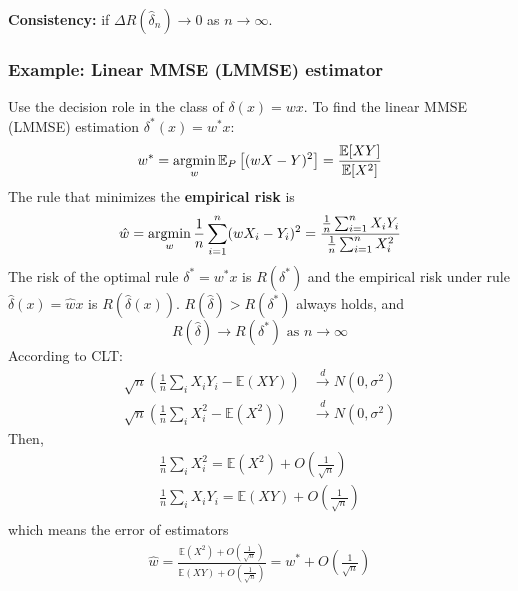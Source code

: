 \documentclass[11pt,a4paper]{article}
\newcommand{\argmin}{\operatornamewithlimits{argmin}}
\begin{document}
\textbf{Consistency:} if $\Delta R(\hat{\delta}_n) \rightarrow 0$ as $n \rightarrow \infty$.

\subsubsection{Example: Linear MMSE (LMMSE) estimator}
Use the decision role in the class of $\delta(x)=wx$. To find the linear MMSE (LMMSE) estimation $\delta^*(x)=w^*x$:
\begin{equation}
    \begin{aligned}
        w^*=\argmin_{w}\mathbb{E}_P\left[(wX-Y)^2\right]=\frac{\mathbb{E}[XY]}{\mathbb{E}[X^2]}
    \end{aligned}
    \nonumber
\end{equation}
The rule that minimizes the \textbf{empirical risk} is
\begin{equation}
    \begin{aligned}
        \hat{w}=\argmin_{w}\frac{1}{n}\sum_{i=1}^n(wX_i-Y_i)^2=\frac{\frac{1}{n}\sum_{i=1}^nX_iY_i}{\frac{1}{n}\sum_{i=1}^nX_i^2}
    \end{aligned}
    \nonumber
\end{equation}
The risk of the optimal rule $\delta^*=w^*x$ is $R(\delta^*)$ and the empirical risk under rule $\hat{\delta}(x)=\hat{w}x$ is $R(\hat{\delta}(x))$. $R(\hat{\delta})>R(\delta^*)$ always holds, and $$R(\hat{\delta})\rightarrow R(\delta^*)\text{ as }n \rightarrow \infty$$
According to CLT:
\begin{equation}
    \begin{aligned}
        \sqrt{n}\left(\frac{1}{n}\sum_iX_iY_i- \mathbb{E}(XY)\right) &\stackrel{d}{\longrightarrow} N(0,\sigma^2)\\
        \sqrt{n}\left(\frac{1}{n}\sum_iX_i^2- \mathbb{E}(X^2)\right) &\stackrel{d}{\longrightarrow} N(0,\sigma^2)
    \end{aligned}
    \nonumber
\end{equation}
Then,
\begin{equation}
    \begin{aligned}
        \frac{1}{n}\sum_iX_i^2=\mathbb{E}(X^2)+O(\frac{1}{\sqrt{n}})\\
        \frac{1}{n}\sum_iX_iY_i=\mathbb{E}(XY)+O(\frac{1}{\sqrt{n}})\\
    \end{aligned}
    \nonumber
\end{equation}
which means the error of estimators
\begin{equation}
    \begin{aligned}
        \hat{w}=\frac{\mathbb{E}(X^2)+O(\frac{1}{\sqrt{n}})}{\mathbb{E}(XY)+O(\frac{1}{\sqrt{n}})}=w^*+O(\frac{1}{\sqrt{n}})
    \end{aligned}
    \nonumber
\end{equation}
\end{document}
